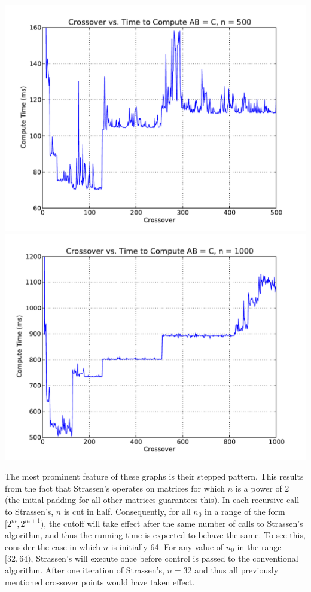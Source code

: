 \documentclass[solution, letterpaper]{cs121}
\begin{document}
\begin{center}
\includegraphics[scale=0.72]{crossover-v-compute-time-500-msec.pdf}
\includegraphics[scale=0.72]{crossover-v-compute-time-1000-msec.pdf}
\end{center}

The most prominent feature of these graphs is their stepped pattern. This results from the fact that Strassen's operates on matrices for which $n$ is a power of 2 (the initial padding for all other matrices guarantees this). In each recursive call to Strassen's, $n$ is cut in half. Consequently, for all $n_0$ in a range of the form $[2^m, 2^{m+1})$, the cutoff will take effect after the same number of calls to Strassen's algorithm, and thus the running time is expected to behave the same. To see this, consider the case in which $n$ is initially 64. For any value of $n_0$ in the range $[32,64)$, Strassen's will execute once before control is passed to the conventional algorithm. After one iteration of Strassen's, $n= 32$ and thus all previously mentioned crossover points would have taken effect.
\end{document}
